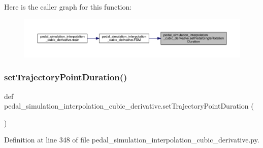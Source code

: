 Here is the caller graph for this function\+:\nopagebreak
\begin{figure}[H]
\begin{center}
\leavevmode
\includegraphics[width=350pt]{namespacepedal__simulation__interpolation__cubic__derivative_a4f6620c14991a28592c3f3dbed06d47d_icgraph}
\end{center}
\end{figure}
\mbox{\label{namespacepedal__simulation__interpolation__cubic__derivative_ac9f7dfe56632b8e7d44453f45ce5ed12}} 
\subsubsection{\texorpdfstring{setTrajectoryPointDuration()}{setTrajectoryPointDuration()}}
{\footnotesize\ttfamily def pedal\+\_\+simulation\+\_\+interpolation\+\_\+cubic\+\_\+derivative.\+set\+Trajectory\+Point\+Duration (\begin{DoxyParamCaption}{ }\end{DoxyParamCaption})}



Definition at line 348 of file pedal\+\_\+simulation\+\_\+interpolation\+\_\+cubic\+\_\+derivative.\+py.


